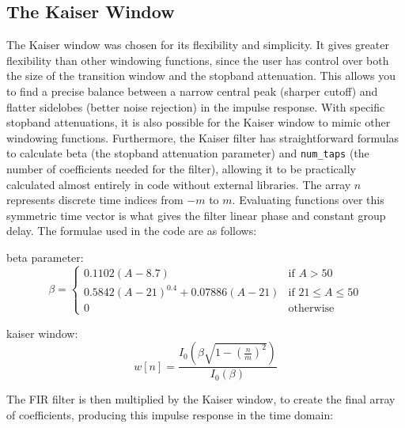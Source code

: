 \documentclass[8pt]{extarticle}
\begin{document}
\subsection{The Kaiser Window}
The Kaiser window was chosen for its flexibility and simplicity. It gives greater flexibility than other windowing functions, 
since the user has control over both the size of the transition window and the stopband attenuation. This allows you to find a precise balance between a narrow central peak (sharper cutoff) and flatter sidelobes (better noise rejection) in the impulse response.
With specific stopband attenuations, it is also possible for the Kaiser window to mimic other windowing functions.
Furthermore, the Kaiser filter has straightforward formulas to calculate beta (the stopband attenuation parameter) and \texttt{num\_taps} (the number of coefficients needed for the filter), 
allowing it to be practically calculated almost entirely in code without external libraries.
The array $n$ represents discrete time indices from $-m$ to $m$. Evaluating functions over this symmetric time vector is what gives the filter linear phase and constant group delay.
The formulae used in the code are as follows:

beta parameter:
\begin{equation}
\beta = 
\begin{cases} 
0.1102 (A - 8.7) & \text{if } A > 50 \\
0.5842 (A - 21)^{0.4} + 0.07886 (A - 21) & \text{if } 21 \le A \le 50 \\
0 & \text{otherwise}
\end{cases}
\end{equation}

kaiser window:
\begin{equation}
w[n] = \frac{I_0 \left( \beta \sqrt{1 - \left( \frac{n}{m} \right)^2} \right)}{I_0(\beta)}
\end{equation}

The FIR filter is then multiplied by the Kaiser window, to create the final array of coefficients, producing this impulse response in the time domain:








\end{document}
